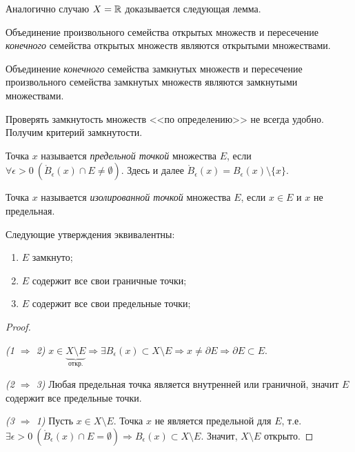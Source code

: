 Аналогично случаю $X = \mathbb{R}$ доказывается следующая лемма.
\begin{lemma}
    Объединение произвольного семейства открытых множеств и пересечение \emph{конечного} семейства открытых множеств являются открытыми множествами.

    Объединение \emph{конечного} семейства замкнутых множеств и пересечение произвольного семейства замкнутых множеств являются замкнутыми множествами.
\end{lemma}

Проверять замкнутость множеств <<по определению>> не всегда удобно. Получим критерий замкнутости.
\begin{definition}
    Точка $x$ называется \emph{предельной точкой} множества $E$, если $\forall \epsilon > 0 \ (\mathring{B}_\epsilon(x) \cap E \neq \emptyset)$. Здесь и далее $\mathring{B}_\epsilon(x) = B_\epsilon(x) \setminus \{x\}$.
\end{definition}

\begin{definition}
    Точка $x$ называется \emph{изолированной точкой} множества $E$, если $x \in E$ и $x$ не предельная.
\end{definition}

\begin{theorem}
    Следующие утверждения эквивалентны:
    \begin{enumerate}
        \item $E$ замкнуто;
        \item $E$ содержит все свои граничные точки;
        \item $E$ содержит все свои предельные точки;
    \end{enumerate}

    \begin{proof}~
    
        \emph{(1 $\Rightarrow$ 2)} $x \in \underbrace{X \setminus E}_{\text{откр.}} \Rightarrow \exists B_\epsilon(x) \subset X \setminus E \Rightarrow x \neq \partial E \Rightarrow \partial E \subset E$.

        \emph{(2 $\Rightarrow$ 3)} Любая предельная точка является внутренней или граничной, значит $E$ содержит все предельные точки.

        \emph{(3 $\Rightarrow$ 1)} Пусть $x \in X \setminus E$. Точка $x$ не является предельной для $E$, т.е. $\exists \epsilon > 0 \ (\mathring{B}_\epsilon(x) \cap E = \emptyset) \Rightarrow B_\epsilon(x) \subset X \setminus E$. Значит, $X \setminus E$ открыто.

    \end{proof}
\end{theorem}

